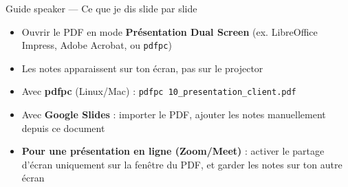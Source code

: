 \documentclass[aspectratio=169, 12pt]{beamer}
\begin{document}
\appendix

\begin{frame}[noframenumbering]{Guide speaker --- Ce que je dis slide par slide}
  \begin{tcolorbox}[colback=gray!5, colframe=gray!40, breakable,
    title={\bfseries Instructions pour utiliser les notes}]
    \begin{itemize}
      \item Ouvrir le PDF en mode \textbf{Présentation Dual Screen} (ex. LibreOffice Impress,
            Adobe Acrobat, ou \texttt{pdfpc})
      \item Les notes apparaissent sur ton écran, pas sur le projector
      \item Avec \textbf{pdfpc} (Linux/Mac) : \texttt{pdfpc 10\_presentation\_client.pdf}
      \item Avec \textbf{Google Slides} : importer le PDF, ajouter les notes manuellement
            depuis ce document
      \item \textbf{Pour une présentation en ligne (Zoom/Meet)} : activer le partage d'écran
            uniquement sur la fenêtre du PDF, et garder les notes sur ton autre écran
    \end{itemize}
  \end{tcolorbox}

\end{frame}
\end{document}
